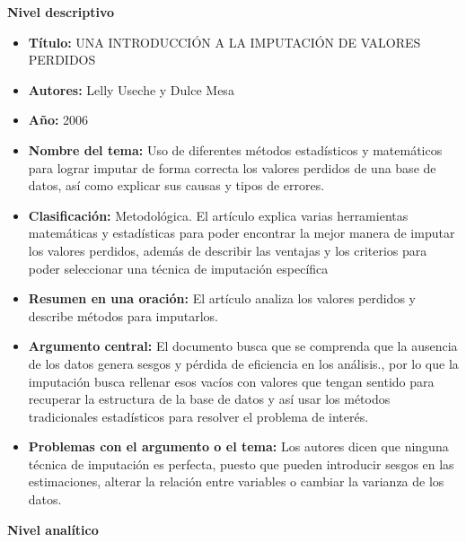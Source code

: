 \documentclass[12pt]{article}
\begin{document}
\textbf{Nivel descriptivo}
\begin{itemize}
    \item \textbf{Título:} UNA INTRODUCCIÓN A LA IMPUTACIÓN DE VALORES PERDIDOS
    
    \item \textbf{Autores:} Lelly Useche y Dulce Mesa
    
    \item \textbf{Año:} 2006 
    
    \item \textbf{Nombre del tema:} Uso de diferentes métodos estadísticos y 
    matemáticos para lograr imputar de forma correcta los valores perdidos de 
    una base de datos, así como explicar sus causas y tipos de errores.
    
 \item \textbf{Clasificación:} Metodológica. El artículo explica varias herramientas
 matemáticas y estadísticas para poder encontrar la mejor manera de imputar los
 valores perdidos, además de describir las ventajas y los criterios para poder 
 seleccionar una técnica de imputación específica

    
    \item \textbf{Resumen en una oración:} El artículo analiza los
    valores perdidos y describe métodos para imputarlos.
    
    \item \textbf{Argumento central:} El documento busca que se
    comprenda que la ausencia de los datos genera sesgos y pérdida 
    de eficiencia en los análisis., por lo que la imputación busca 
    rellenar esos vacíos con valores que tengan sentido para recuperar 
    la estructura de la base de datos y así usar los métodos tradicionales 
    estadísticos para resolver el problema de interés.
    
    \item \textbf{Problemas con el argumento o el tema:} Los autores 
    dicen que ninguna técnica de imputación es perfecta, puesto que 
    pueden introducir sesgos en las estimaciones, alterar la relación 
    entre variables o cambiar la varianza de los datos.  \\
\end{itemize}

\textbf{Nivel analítico}
\end{document}
